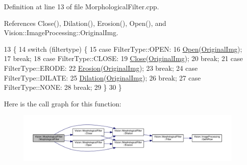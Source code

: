 Definition at line 13 of file Morphological\+Filter.\+cpp.



References Close(), Dilation(), Erosion(), Open(), and Vision\+::\+Image\+Processing\+::\+Original\+Img.


\begin{DoxyCode}
13                                                               \{
14   \textcolor{keywordflow}{switch} (filtertype) \{
15   \textcolor{keywordflow}{case} FilterType::OPEN:
16     \hyperlink{class_vision_1_1_morphological_filter_a5e57dd85a3c583242b62c5669deab9a0}{Open}(\hyperlink{class_vision_1_1_image_processing_a77c370dab270158a4e9c634e2d3f48e7}{OriginalImg});
17     \textcolor{keywordflow}{break};
18   \textcolor{keywordflow}{case} FilterType::CLOSE:
19     \hyperlink{class_vision_1_1_morphological_filter_ad18de4b3b27d7cd0465cd7f8c3d0b52f}{Close}(\hyperlink{class_vision_1_1_image_processing_a77c370dab270158a4e9c634e2d3f48e7}{OriginalImg});
20     \textcolor{keywordflow}{break};
21   \textcolor{keywordflow}{case} FilterType::ERODE:
22     \hyperlink{class_vision_1_1_morphological_filter_a62ad82519dc19be6367193a5d539c98b}{Erosion}(\hyperlink{class_vision_1_1_image_processing_a77c370dab270158a4e9c634e2d3f48e7}{OriginalImg});
23     \textcolor{keywordflow}{break};
24   \textcolor{keywordflow}{case} FilterType::DILATE:
25     \hyperlink{class_vision_1_1_morphological_filter_abfba03324b8dd0280925463941345417}{Dilation}(\hyperlink{class_vision_1_1_image_processing_a77c370dab270158a4e9c634e2d3f48e7}{OriginalImg});
26     \textcolor{keywordflow}{break};
27   \textcolor{keywordflow}{case} FilterType::NONE:
28     \textcolor{keywordflow}{break};
29   \}
30 \}
\end{DoxyCode}


Here is the call graph for this function\+:\nopagebreak
\begin{figure}[H]
\begin{center}
\leavevmode
\includegraphics[width=350pt]{class_vision_1_1_morphological_filter_adee61b49563bbab5c62699ce3b66f61d_cgraph}
\end{center}
\end{figure}


\hypertarget{class_vision_1_1_morphological_filter_a629a6d6a08e47bad397dea88506ee18a}{}
